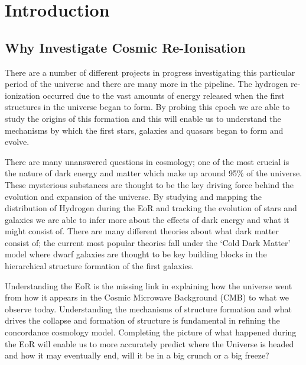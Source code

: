 
\section{Introduction} %
\label{sec:introduction}
    \subsection{Why Investigate Cosmic Re-Ionisation} %
    \label{sub:why_investigate_cosmic_re_ionisation}
    	There are a number of different projects in progress investigating this particular period of the universe and there are many more in the pipeline. The hydrogen re-ionization occurred due to the vast amounts of energy released when the first structures in the universe began to form. By probing this epoch we are able to study the origins of this formation and this will enable us to understand the mechanisms by which the first stars, galaxies and quasars began to form and evolve.

		There are many unanswered questions in cosmology; one of the most crucial is the nature of dark energy and matter which make up around 95\% of the universe\cite{WMAP9}.  These mysterious substances are thought to be the key driving force behind the evolution and expansion of the universe. By studying and mapping the distribution of Hydrogen during the EoR and tracking the evolution of stars and galaxies we are able to infer more about the effects of dark energy and what it might consist of. There are many different theories about what dark matter consist of; the current most popular theories fall under the ‘Cold Dark Matter’ model where dwarf galaxies are thought to be key building blocks in the hierarchical structure formation of the first galaxies\cite{Cignoni}.

		Understanding the EoR is the missing link in explaining how the universe went from how it appears in the Cosmic Microwave Background (CMB) to what we observe today. Understanding the mechanisms of structure formation and what drives the collapse and formation of structure is fundamental in refining the concordance cosmology model. Completing the picture of what happened during the EoR will enable us to more accurately predict where the Universe is headed and how it may eventually end, will it be in a big crunch or a big freeze?

